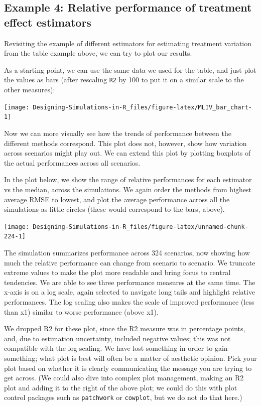\documentclass[
]{book}
\begin{document}
\subsection{Example 4: Relative performance of treatment effect estimators}\label{example-4-relative-performance-of-treatment-effect-estimators}

Revisiting the example of different estimators for estimating treatment variation from the table example above, we can try to plot our results.

As a starting point, we can use the same data we used for the table, and just plot the values as bars (after rescaling \texttt{R2} by 100 to put it on a similar scale to the other measures):

\begin{center}\texttt{[image: Designing-Simulations-in-R\_files/figure-latex/MLIV\_bar\_chart-1]} \end{center}

Now we can more visually see how the trends of performance between the different methods correspond.
This plot does not, however, show how variation across scenarios might play out.
We can extend this plot by plotting boxplots of the actual performances across all scenarios.

In the plot below, we show the range of relative performances for each estimator vs the median, across the simulations.
We again order the methods from highest average RMSE to lowest, and plot the average performance across all the simulations as little circles (these would correspond to the bars, above).

\begin{center}\texttt{[image: Designing-Simulations-in-R\_files/figure-latex/unnamed-chunk-224-1]} \end{center}

The simulation summarizes performance across 324 scenarios, now showing how much the relative performance can change from scenario to scenario.
We truncate extreme values to make the plot more readable and bring focus to central tendencies.
We are able to see three performance measures at the same time.
The x-axis is on a log scale, again selected to navigate long tails and highlight relative performances.
The log scaling also makes the scale of improved performance (less than x1) similar to worse performance (above x1).

We dropped R2 for these plot, since the R2 measure was in percentage points, and, due to estimation uncertainty, included negative values; this was not compatible with the log scaling.
We have lost something in order to gain something; what plot is best will often be a matter of aesthetic opinion.
Pick your plot based on whether it is clearly communicating the message you are trying to get across.
(We could also dive into complex plot management, making an R2 plot and adding it to the right of the above plot; we could do this with plot control packages such as \texttt{patchwork} or \texttt{cowplot}, but we do not do that here.)
\end{document}
